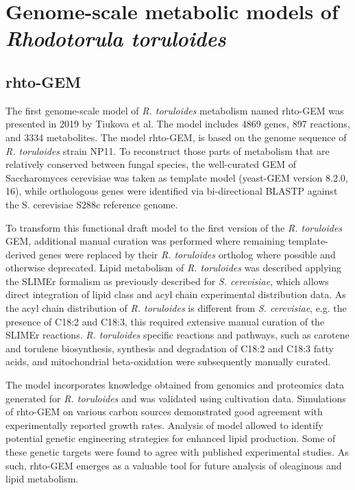 \section{Genome-scale metabolic models of \textit{Rhodotorula toruloides}} 

\subsection{rhto-GEM}

The first genome-scale model of \textit{R. toruloides} metabolism named rhto-GEM was presented in 2019 by Tiukova et al. The model includes 4869 genes, 
897 reactions, and 3334 metabolites. The model rhto-GEM, is based on the genome sequence of \textit{R. toruloides} strain 
NP11. To reconstruct those parts of metabolism that are relatively conserved between fungal species, the 
well-curated GEM of Saccharomyces cerevisiae was taken as template model (yeast-GEM version 
8.2.0, 16), while orthologous genes were identified via bi-directional BLASTP against the S. cerevisiae 
S288c reference genome. \cite{Tiukova2019}

To transform this functional draft model to the first version of the \textit{R. toruloides} GEM, additional 
manual curation was performed where remaining template-derived genes were replaced by their \textit{R. toruloides} 
ortholog where possible and otherwise deprecated. Lipid metabolism of \textit{R. toruloides} was described applying 
the SLIMEr formalism as previously described for \textit{S. cerevisiae}, which allows direct 
integration of lipid class and acyl chain experimental distribution data. As the acyl chain distribution of 
\textit{R. toruloides} is different from \textit{S. cerevisiae}, e.g. the presence of C18:2 and C18:3, this required extensive manual curation of the SLIMEr reactions. 
\textit{R. toruloides} specific reactions and pathways, such as carotene and torulene biosynthesis, synthesis 
and degradation of C18:2 and C18:3 fatty acids, and mitochondrial beta-oxidation were subsequently 
manually curated. \cite{Tiukova2019}

The model incorporates knowledge obtained from genomics and proteomics data generated for
\textit{R. toruloides} and was validated using cultivation data. Simulations of rhto-GEM on 
various carbon sources demonstrated good agreement with experimentally reported growth rates. 
Analysis of model allowed to identify potential genetic engineering strategies for enhanced lipid production. 
Some of these genetic targets were found to agree with published experimental studies. 
As such, rhto-GEM emerges as a valuable tool for future analysis of oleaginous and lipid 
metabolism. \cite{Tiukova2019}


